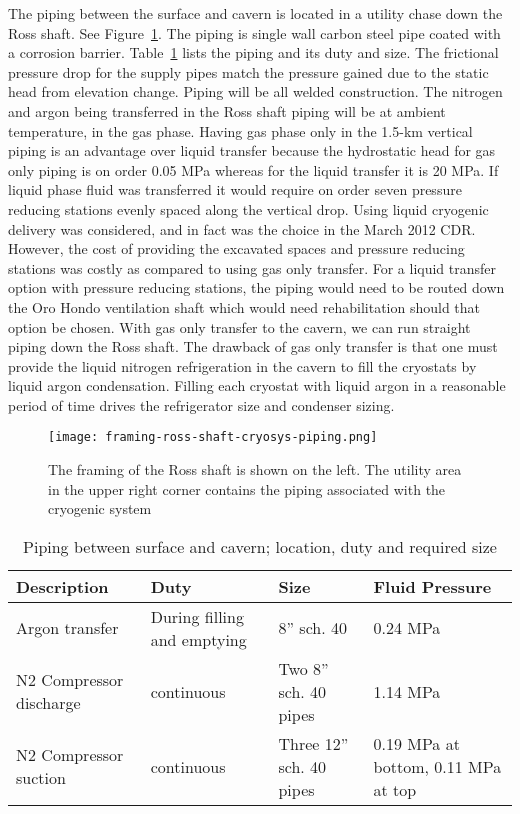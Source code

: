 The piping between the
surface and cavern is located in a utility chase down the Ross shaft.
See Figure~\ref{fig:framing-at-ross-piping}. The piping is single wall carbon steel pipe coated with a corrosion barrier. 
Table~\ref{table:pipelines} lists the piping and its duty and size. The frictional pressure drop for the supply pipes match
the pressure gained due to the static head
from elevation change. Piping will be all welded
construction. The nitrogen and argon being transferred in the Ross shaft piping will be at
ambient temperature, in the gas phase. Having gas phase only in the 1.5-km vertical piping is
an advantage over liquid transfer because the hydrostatic head for gas only piping is on order
0.05 MPa whereas for the liquid transfer it is 20 MPa. If liquid phase fluid was transferred it
would require on order
seven pressure reducing stations evenly spaced along the vertical drop.
Using liquid cryogenic delivery was considered, and in fact was the choice in the March 2012
CDR. However, the cost of providing the excavated spaces and pressure reducing stations
was costly as compared to using gas only transfer. For a liquid transfer option with pressure
reducing stations, the piping would need to be routed down the Oro Hondo ventilation shaft
which would need rehabilitation should that option be chosen. With gas only transfer to the
cavern, we can run straight piping down the Ross shaft. The drawback of gas only transfer is
that one must provide the liquid nitrogen refrigeration in the cavern to fill the cryostats by
liquid argon condensation. Filling each cryostat with liquid argon in a reasonable
period of time drives the refrigerator size and condenser sizing.

\begin{figure}[htbp]
\centering
\texttt{[image: framing-ross-shaft-cryosys-piping.png]} 
\caption{ The framing of the Ross shaft is shown on the left. The utility area in the upper
right corner contains the piping
associated with the cryogenic system}
\label{fig:framing-at-ross-piping}
\end{figure}

\begin{table}
\caption{Piping between surface and cavern; location, duty and required size}
\label{table:pipelines}
\begin{tabular}[htbp]{|p{}|p{}|p{}|p{}|}
\hline
{\bf Description} & {\bf Duty} & {\bf Size} & {\bf Fluid Pressure} \\
\hline
Argon transfer & During filling and emptying & 8'' sch. 40 &  0.24 MPa\\
\hline
N2 Compressor discharge & continuous & Two 8'' sch. 40 pipes & 1.14 MPa \\
\hline
N2 Compressor suction & continuous & Three 12'' sch. 40 pipes &  0.19 MPa at bottom, 0.11 MPa at top \\
\hline\end{tabular} 
\end{table}

